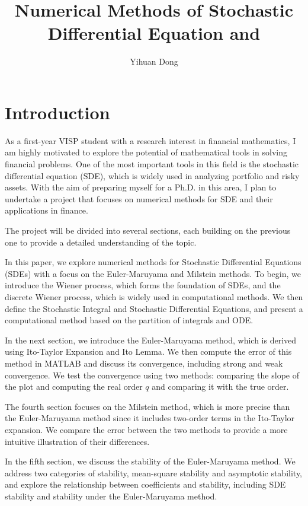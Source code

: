 \documentclass[12pt,a4paper]{article}
\title{Numerical Methods of Stochastic Differential Equation and }
\author{Yihuan Dong}
\theoremstyle{definition}
\begin{document}
\maketitle


\section{Introduction}
As a first-year VISP student with a research interest in financial mathematics, I am highly motivated to explore the potential of mathematical tools in solving financial problems. One of the most important tools in this field is the stochastic differential equation (SDE), which is widely used in analyzing portfolio and risky assets. With the aim of preparing myself for a Ph.D. in this area, I plan to undertake a project that focuses on numerical methods for SDE and their applications in finance.

The project will be divided into several sections, each building on the previous one to
provide a detailed understanding of the topic.

In this paper, we explore numerical methods for Stochastic Differential Equations (SDEs) with a focus on the Euler-Maruyama and Milstein methods. To begin, we introduce the Wiener process, which forms the foundation of SDEs, and the discrete Wiener process, which is widely used in computational methods. We then define the Stochastic Integral and Stochastic Differential Equations, and present a computational method based on the partition of integrals and ODE.

In the next section, we introduce the Euler-Maruyama method, which is derived using Ito-Taylor Expansion and Ito Lemma. We then compute the error of this method in MATLAB and discuss its convergence, including strong and weak convergence. We test the convergence using two methods: comparing the slope of the plot and computing the real order $q$ and comparing it with the true order.

The fourth section focuses on the Milstein method, which is more precise than the Euler-Maruyama method since it includes two-order terms in the Ito-Taylor expansion. We compare the error between the two methods to provide a more intuitive illustration of their differences.

In the fifth section, we discuss the stability of the Euler-Maruyama method. We address two categories of stability, mean-square stability and asymptotic stability, and explore the relationship between coefficients and stability, including SDE stability and stability under the Euler-Maruyama method.
\end{document}
